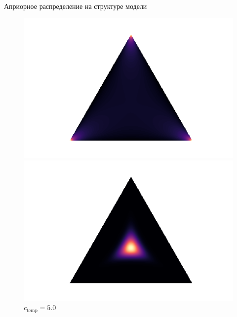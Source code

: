 \documentclass[usenames,dvipsnames,11pt,pdf,utf8,russian,aspectratio=43]{beamer}
\begin{document}
\begin{frame}{Априорное распределение на структуре модели}
\begin{figure}
\begin{minipage}[t]{.3\textwidth}
\begin{tikzpicture}[%
x={(1.7cm,0cm)},
y={(0cm,1.7cm)},
]
\end{tikzpicture}
\caption*{$c_\text{temp}\to0$}
\end{minipage}
\hfill
 \begin{minipage}[t]{.3\textwidth}
   \includegraphics[width=\textwidth]{gs0995.png}
\caption*{$c_\text{temp}=0.995$}
\end{minipage}
\hfill
 \begin{minipage}[t]{.3\textwidth}
   \includegraphics[width=\textwidth]{gs5.png}
\caption*{$c_\text{temp}=5.0$}
\end{minipage}

\end{figure}
\end{frame}
\end{document}

